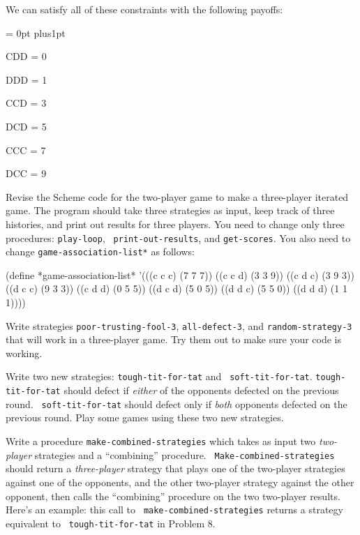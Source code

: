 \noindent We can satisfy all of these constraints with the following payoffs:

{\narrower \narrower
{\parskip = 0pt plus1pt

        CDD = 0

        DDD = 1

        CCD = 3

        DCD = 5

        CCC = 7

        DCC = 9

}}


\vskip 4pt


Revise the Scheme code for the two-player game to make a three-player
iterated game. The program should take three strategies as input, keep
track of three histories, and print out results for three players. You
need to change only three procedures: {\tt play-loop}, {\tt
print-out-results}, and {\tt get-scores}. You also need to change
{\tt *game-association-list*} as follows:

\beginlisp
(define *game-association-list*
  '(((c c c) (7 7 7))
    ((c c d) (3 3 9))
    ((c d c) (3 9 3))
    ((d c c) (9 3 3))
    ((c d d) (0 5 5))
    ((d c d) (5 0 5))
    ((d d c) (5 5 0))
    ((d d d) (1 1 1))))
\endlisp

\vskip 4pt


Write strategies {\tt poor-trusting-fool-3}, {\tt all-defect-3}, and
{\tt random-strategy-3} that will work in a three-player game. Try
them out to make sure your code is working.

\vskip 8pt


Write two new strategies: {\tt tough-tit-for-tat} and {\tt
soft-tit-for-tat}. {\tt tough-tit-for-tat} should defect if {\it
either} of the opponents defected on the previous round.  {\tt
soft-tit-for-tat} should defect only if {\it both} opponents defected
on the previous round. Play some games using these two new strategies.

\vskip 8pt


Write a procedure {\tt make-combined-strategies} which takes as input
two {\it two-player} strategies and a ``combining'' procedure.  {\tt
Make-combined-strategies} should return a {\it three-player} strategy
that plays one of the two-player strategies against one of the
opponents, and the other two-player strategy against the other
opponent, then calls the ``combining'' procedure on the two two-player
results. Here's an example: this call to {\tt
make-combined-strategies} returns a strategy equivalent to {\tt
tough-tit-for-tat} in Problem 8.

